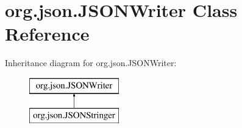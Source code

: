 \hypertarget{classorg_1_1json_1_1JSONWriter}{\section{org.\-json.\-J\-S\-O\-N\-Writer Class Reference}
\label{classorg_1_1json_1_1JSONWriter}
}
Inheritance diagram for org.\-json.\-J\-S\-O\-N\-Writer\-:\begin{figure}[H]
\begin{center}
\leavevmode
\includegraphics[height=2.000000cm]{classorg_1_1json_1_1JSONWriter}
\end{center}
\end{figure}
